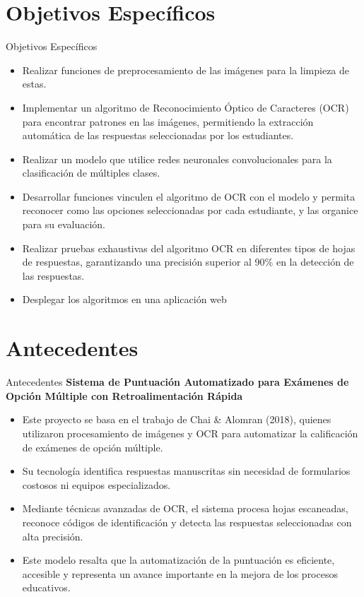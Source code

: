 \documentclass{beamer}
\begin{document}
\section{Objetivos Específicos}
\begin{frame}{Objetivos Específicos}
    \begin{itemize}
        \item Realizar funciones de preprocesamiento de las imágenes para la limpieza de estas.
        \item Implementar un algoritmo de Reconocimiento Óptico de Caracteres (OCR) para encontrar patrones en las imágenes, permitiendo la extracción automática de las respuestas seleccionadas por los estudiantes.
        \item Realizar un modelo que utilice redes neuronales convolucionales para la clasificación de múltiples clases.
        \item Desarrollar funciones vinculen el algoritmo de OCR con el modelo y permita reconocer como las opciones seleccionadas por cada estudiante, y las organice para su evaluación.
        \item Realizar pruebas exhaustivas del algoritmo OCR en diferentes tipos de hojas de respuestas, garantizando una precisión superior al 90\% en la detección de las respuestas.
        \item Desplegar los algoritmos en una aplicación web
    \end{itemize}
\end{frame}

\section{Antecedentes}
\begin{frame}{Antecedentes}
    \textbf{Sistema de Puntuación Automatizado para Exámenes de Opción Múltiple con Retroalimentación Rápida}
    \begin{itemize}
        \item Este proyecto se basa en el trabajo de Chai \& Alomran (2018), quienes utilizaron procesamiento de imágenes y OCR para automatizar la calificación de exámenes de opción múltiple.
        \item Su tecnología identifica respuestas manuscritas sin necesidad de formularios costosos ni equipos especializados.
        \item Mediante técnicas avanzadas de OCR, el sistema procesa hojas escaneadas, reconoce códigos de identificación y detecta las respuestas seleccionadas con alta precisión.
        \item Este modelo resalta que la automatización de la puntuación es eficiente, accesible y representa un avance importante en la mejora de los procesos educativos.
    \end{itemize}
\end{frame}
\end{document}
